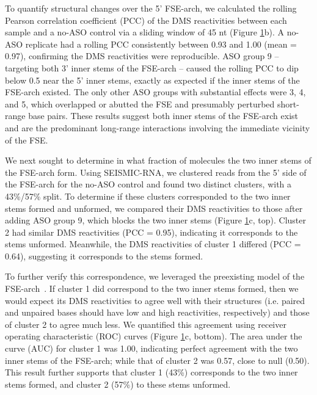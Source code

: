 \documentclass[main.tex]{subfiles}
\begin{document}
\begin{figure}[H]
	\label{tiles}
\end{figure}

To quantify structural changes over the 5' FSE-arch, we calculated the rolling Pearson correlation coefficient (PCC) of the DMS reactivities between each sample and a no-ASO control via a sliding window of 45 nt (Figure \ref{tiles}b).
A no-ASO replicate had a rolling PCC consistently between 0.93 and 1.00 (mean = 0.97), confirming the DMS reactivities were reproducible.
ASO group 9 -- targeting both 3' inner stems of the FSE-arch -- caused the rolling PCC to dip below 0.5 near the 5' inner stems, exactly as expected if the inner stems of the FSE-arch existed.
The only other ASO groups with substantial effects were 3, 4, and 5, which overlapped or abutted the FSE and presumably perturbed short-range base pairs.
These results suggest both inner stems of the FSE-arch exist and are the predominant long-range interactions involving the immediate vicinity of the FSE.

We next sought to determine in what fraction of molecules the two inner stems of the FSE-arch form.
Using SEISMIC-RNA, we clustered reads from the 5' side of the FSE-arch for the no-ASO control and found two distinct clusters, with a 43\%/57\% split.
To determine if these clusters corresponded to the two inner stems formed and unformed, we compared their DMS reactivities to those after adding ASO group 9, which blocks the two inner stems (Figure \ref{tiles}c, top).
Cluster 2 had similar DMS reactivities (PCC = 0.95), indicating it corresponds to the stems unformed.
Meanwhile, the DMS reactivities of cluster 1 differed (PCC = 0.64), suggesting it corresponds to the stems formed.

To further verify this correspondence, we leveraged the preexisting model of the FSE-arch~\cite{Ziv2020}.
If cluster 1 did correspond to the two inner stems formed, then we would expect its DMS reactivities to agree well with their structures (i.e. paired and unpaired bases should have low and high reactivities, respectively) and those of cluster 2 to agree much less.
We quantified this agreement using receiver operating characteristic (ROC) curves (Figure \ref{tiles}c, bottom).
The area under the curve (AUC) for cluster 1 was 1.00, indicating perfect agreement with the two inner stems of the FSE-arch; while that of cluster 2 was 0.57, close to null (0.50).
This result further supports that cluster 1 (43\%) corresponds to the two inner stems formed, and cluster 2 (57\%) to these stems unformed.
\end{document}
